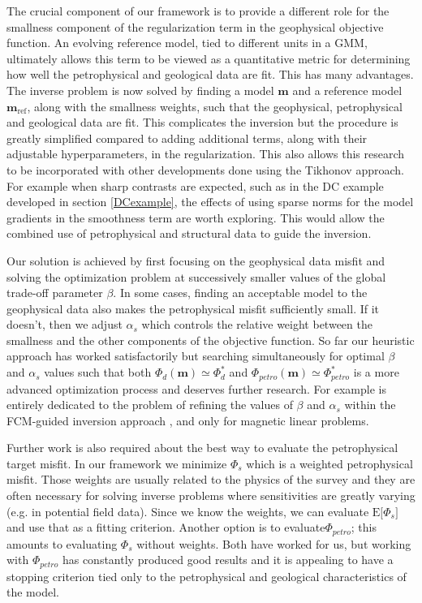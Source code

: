 \documentclass[extra]{gji} %
\begin{document}
The crucial component of our framework is to provide a different role for the smallness component of the regularization term in the geophysical objective function. An evolving reference model, tied to different units in a GMM, ultimately allows this term to be viewed as a quantitative metric for determining how well the petrophysical and geological data are fit. This has many advantages. The inverse problem is now solved by finding a model $\mathbf{m}$ and a reference model $\mathbf{m}_{\text{ref}}$, along with the smallness weights, such that the geophysical, petrophysical and geological data are fit. This complicates the inversion but the procedure is greatly simplified compared to adding additional terms, along with their adjustable hyperparameters, in the regularization. This also allows this research to be incorporated with other developments done using the Tikhonov approach. For example when sharp contrasts are expected, such as in the DC example developed in section \ref{DCexample}, the effects of using sparse norms for the model gradients in the smoothness term \citep{SparseNorms2} are worth exploring. This would allow the combined use of petrophysical and structural data to guide the inversion.

Our solution is achieved by first focusing on the geophysical data misfit and solving the optimization problem at successively smaller values of the global trade-off parameter $\beta$. In some cases, finding an acceptable model to the geophysical data also makes the petrophysical misfit sufficiently small. If it doesn't, then we adjust $\alpha_s$ which controls the relative weight between the smallness and the other components of the objective function. So far our heuristic approach has worked satisfactorily but searching simultaneously for optimal $\beta$ and $\alpha_s$ values such that both $\Phi_d(\mathbf{m})\simeq\Phi_d^*$ and $\Phi_{petro}(\mathbf{m})\simeq\Phi_{petro}^*$ is a more advanced optimization process and deserves further research. For example \cite{BetaAlphaEstimation} is entirely dedicated to the problem of refining the values of $\beta$ and $\alpha_s$ within the FCM-guided inversion approach \citep{Sun2015}, and only for magnetic linear problems.

Further work is also required about the best way to evaluate the petrophysical target misfit. In our framework we minimize $\Phi_s$ which is a weighted petrophysical misfit. Those weights are usually related to the physics of the survey and they are often necessary for solving inverse problems where sensitivities are greatly varying (e.g. in potential field data). Since we know the weights, we can evaluate $\text{E}\lbrack\Phi_s\rbrack$ and use that as a fitting criterion. Another option is to evaluate$\Phi_{petro}$; this amounts to evaluating $\Phi_s$ without weights. Both have worked for us, but working with $\Phi_{petro}$ has constantly produced good results and it is appealing to have a stopping criterion tied only to the petrophysical and geological characteristics of the model.
\end{document}
